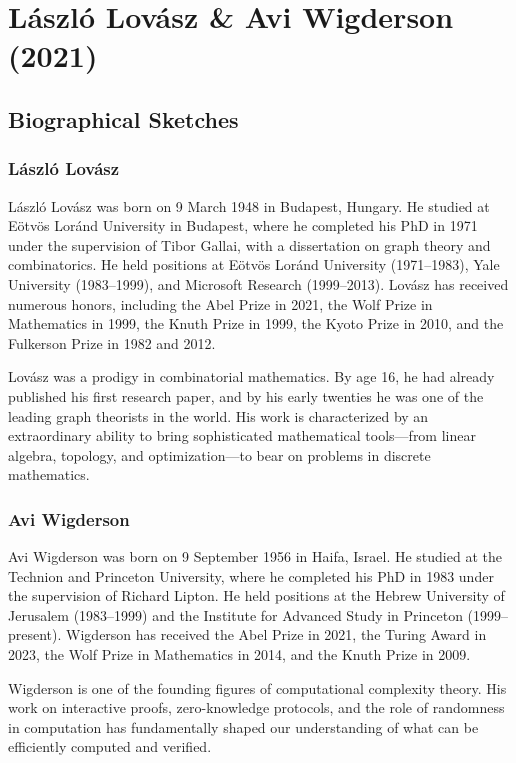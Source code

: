\chapter{L\'aszl\'o Lov\'asz \& Avi Wigderson (2021)}

\section{Biographical Sketches}

\subsection{L\'aszl\'o Lov\'asz}

L\'aszl\'o Lov\'asz was born on 9 March 1948 in Budapest, Hungary. He studied at E\"otv\"os Lor\'and University in Budapest, where he completed his PhD in 1971 under the supervision of Tibor Gallai, with a dissertation on graph theory and combinatorics. He held positions at E\"otv\"os Lor\'and University (1971--1983), Yale University (1983--1999), and Microsoft Research (1999--2013). Lov\'asz has received numerous honors, including the Abel Prize in 2021, the Wolf Prize in Mathematics in 1999, the Knuth Prize in 1999, the Kyoto Prize in 2010, and the Fulkerson Prize in 1982 and 2012.

Lov\'asz was a prodigy in combinatorial mathematics. By age 16, he had already published his first research paper, and by his early twenties he was one of the leading graph theorists in the world. His work is characterized by an extraordinary ability to bring sophisticated mathematical tools---from linear algebra, topology, and optimization---to bear on problems in discrete mathematics.

\subsection{Avi Wigderson}

Avi Wigderson was born on 9 September 1956 in Haifa, Israel. He studied at the Technion and Princeton University, where he completed his PhD in 1983 under the supervision of Richard Lipton. He held positions at the Hebrew University of Jerusalem (1983--1999) and the Institute for Advanced Study in Princeton (1999--present). Wigderson has received the Abel Prize in 2021, the Turing Award in 2023, the Wolf Prize in Mathematics in 2014, and the Knuth Prize in 2009.

Wigderson is one of the founding figures of computational complexity theory. His work on interactive proofs, zero-knowledge protocols, and the role of randomness in computation has fundamentally shaped our understanding of what can be efficiently computed and verified.

